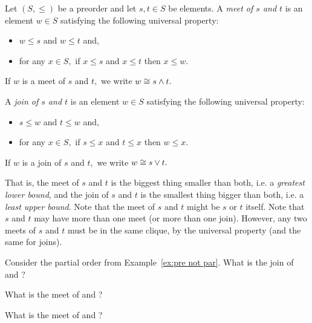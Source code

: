 \documentclass[../main/CT4S-EN-RU]{subfiles}
\begin{document}
\begin{definitionENG}\label{def:meets and joins}
Let $(S,\leq)$ be a preorder and let $s,t\in S$ be elements. A {\em meet of $s$ and $t$} is an element $w\in S$ satisfying the following universal property: 
\begin{itemize}
\item $w\leq s$ and $w\leq t$ and, 
\item for any $x\in S,$ if $x\leq s$ and $x\leq t$ then $x\leq w.$
\end{itemize}
If $w$ is a meet of $s$ and $t,$ we write $w\cong s\wedge t.$

A {\em join of $s$ and $t$} is an element $w\in S$ satisfying the following universal property: 
\begin{itemize}
\item $s\leq w$ and $t\leq w$ and, 
\item for any $x\in S,$ if $s\leq x$ and $t\leq x$ then $w\leq x.$
\end{itemize}
If $w$ is a join of $s$ and $t,$ we write $w\cong s\vee t.$
\end{definitionENG}

\begin{definitionRUS}\label{def:meets and joins}
\end{definitionRUS}

\begin{blockENG}
That is, the meet of $s$ and $t$ is the biggest thing smaller than both, i.e. a {\em greatest lower bound}, and the join of $s$ and $t$ is the smallest thing bigger than both, i.e. a {\em least upper bound}. Note that the meet of $s$ and $t$ might be $s$ or $t$ itself.  Note that $s$ and $t$ may have more than one meet (or more than one join). However, any two meets of $s$ and $t$ must be in the same clique, by the universal property (and the same for joins).
\end{blockENG}

\begin{blockRUS}
\end{blockRUS}

\begin{exerciseENG}
Consider the partial order from Example~\ref{ex:pre not par}. 
\sexc What is the join of  and ? 
\item What is the meet of  and ? 
\item What is the meet of  and ?
\endsexc
\end{exerciseENG}
\end{document}
